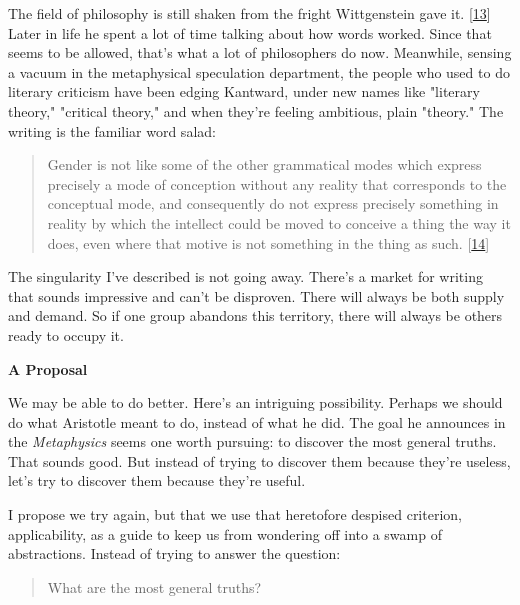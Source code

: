 The field of
                  philosophy is still shaken from the fright Wittgenstein gave
                  it.
                  [\href{\#f13n}{13}]
                  Later in life he spent a lot of time talking about how words
                  worked. Since that seems to be allowed, that's what a lot of
                  philosophers do now. Meanwhile, sensing a vacuum in the
                  metaphysical speculation department, the people who used to do
                  literary criticism have been edging Kantward, under new names
                  like "literary theory," "critical theory," and when they're
                  feeling ambitious, plain "theory." The writing is the familiar
                  word salad:
                  \begin{quote}

                    Gender is not like some of the other grammatical modes which
                    express precisely a mode of conception without any reality
                    that corresponds to the conceptual mode, and consequently do
                    not express precisely something in reality by which the
                    intellect could be moved to conceive a thing the way it
                    does, even where that motive is not something in the thing
                    as such.
                    [\href{\#f14n}{14}]
                  
\end{quote}

                  The singularity I've described is not going away. There's a
                  market for writing that sounds impressive and can't be
                  disproven. There will always be both supply and demand. So if
                  one group abandons this territory, there will always be others
                  ready to occupy it.

\textbf{A Proposal}

We
                  may be able to do better. Here's an intriguing possibility.
                  Perhaps we should do what Aristotle meant to do, instead of
                  what he did. The goal he announces in the
                  \emph{Metaphysics} seems one worth pursuing: to discover the
                  most general truths. That sounds good. But instead of trying
                  to discover them because they're useless, let's try to
                  discover them because they're useful.

I propose we
                  try again, but that we use that heretofore despised criterion,
                  applicability, as a guide to keep us from wondering off into a
                  swamp of abstractions. Instead of trying to answer the
                  question:
                  \begin{quote}
What are the most general truths?
\end{quote}

